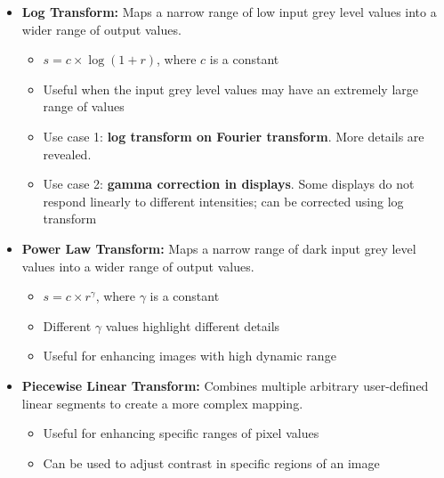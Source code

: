 \begin{itemize}
  \item \textbf{Log Transform:} Maps a narrow range of low input grey level values into a wider range of output values.
    \begin{itemize}
      \item $s = c \times \log(1 + r)$, where $c$ is a constant
      \item Useful when the input grey level values may have an extremely large range of values
      \item Use case 1: \textbf{log transform on Fourier transform}. More details are revealed.
      \item Use case 2: \textbf{gamma correction in displays}. Some displays do not respond linearly to different intensities; can be corrected using log transform
    \end{itemize}

  \item \textbf{Power Law Transform:} Maps a narrow range of dark input grey level values into a wider range of output values.
    \begin{itemize}
      \item $s = c \times r^{\gamma}$, where $\gamma$ is a constant
      \item Different $\gamma$ values highlight different details
      \item Useful for enhancing images with high dynamic range
    \end{itemize}

  \item \textbf{Piecewise Linear Transform:} Combines multiple arbitrary user-defined linear segments to create a more complex mapping.
    \begin{itemize}
      \item Useful for enhancing specific ranges of pixel values
      \item Can be used to adjust contrast in specific regions of an image
    \end{itemize}


\end{itemize}
